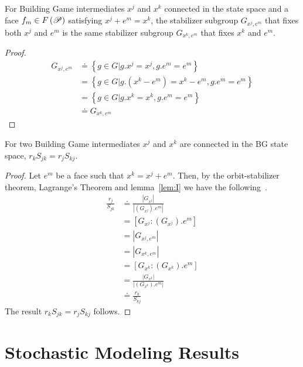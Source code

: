 \begin{mylem}
\label{lem:I}
For Building Game intermediates $x^j$ and $x^k$ connected in the state space and a face $f_m \in F\left(\mathscr{P}\right)$ satisfying $x^j + e^m = x^k$, the stabilizer subgroup $G_{x^j,e^m}$ that fixes both $x^j$ and $e^m$ is the same stabilizer subgroup $G_{x^k,e^m}$ that fixes $x^k$ and $e^m$.
\end{mylem}
\begin{proof}
\begin{align}
G_{x^j,e^m} &\doteq \left\{g \in G | g.x^j = x^j, g.e^m = e^m \right\} \\
                &= \left\{g \in G | g.\left(x^k - e^m\right) = x^k - e^m, g.e^m = e^m \right\} \\
                &= \left\{g \in G | g.x^k = x^k, g.e^m = e^m \right\} \\
                &\doteq G_{x^k,e^m}
\end{align}
\end{proof}


\begin{mythm}
\label{thm:J}
For two Building Game intermediates $x^j$ and $x^k$ are connected in the BG state space, $r_kS_{jk} = r_jS_{kj}$.
\end{mythm}
\begin{proof}
Let $e^m$ be a face such that $x^k = x^j + e^m$. Then, by the orbit-stabilizer theorem, Lagrange's Theorem and lemma~\ref{lem:I} we have the following~\cite{Rotman1995}.
\begin{align}
\frac{r_j}{S_{jk}} &\doteq \frac{\left|G_{x^j}\right|}{\left|\left(G_{x^j}\right).e^m\right|} \\
                   &= \left[G_{x^j} : \left(G_{x^j}\right).e^m \right] \\
                   &= \left|G_{x^j,e^m}\right| \\
                   &= \left|G_{x^k,e^m}\right| \\
                   &= \left[G_{x^k} : \left(G_{x^k}\right).e^m \right] \\
                   &= \frac{\left|G_{x^k}\right|}{\left|\left(G_{x^k}\right).e^m\right|} \\
                   &\doteq \frac{r_k}{S_{kj}} 
\end{align}
The result $r_kS_{jk} = r_jS_{kj}$ follows.
\end{proof}


\section{Stochastic Modeling Results}

